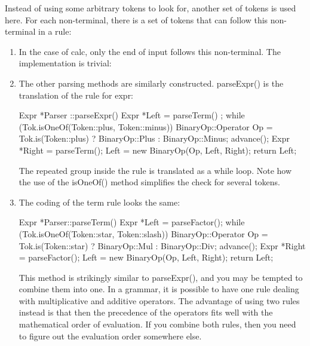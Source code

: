 
Instead of using some arbitrary tokens to look for, another set of tokens is used here. For each non-terminal, there is a set of tokens that can follow this non-terminal in a rule:

\begin{enumerate}
\item
In the case of calc, only the end of input follows this non-terminal. The implementation is trivial:

\begin{cpp}
_error:
    while (!Tok.is(Token::eoi))
        advance();
    return nullptr;
}
\end{cpp}

\item
The other parsing methods are similarly constructed. parseExpr() is the translation of the rule for expr:

\begin{cpp}
Expr *Parser ::parseExpr() {
    Expr *Left = parseTerm() ;
    while (Tok.isOneOf(Token::plus, Token::minus)) {
        BinaryOp::Operator Op =
            Tok.is(Token::plus) ? BinaryOp::Plus :
                                  BinaryOp::Minus;
        advance();
        Expr *Right = parseTerm();
        Left = new BinaryOp(Op, Left, Right);
    }
    return Left;
}
\end{cpp}

The repeated group inside the rule is translated as a while loop. Note how the use of the isOneOf() method simplifies the check for several tokens.

\item
The coding of the term rule looks the same:

\begin{cpp}
Expr *Parser::parseTerm() {
    Expr *Left = parseFactor();
    while (Tok.isOneOf(Token::star, Token::slash)) {
        BinaryOp::Operator Op =
            Tok.is(Token::star) ? BinaryOp::Mul :
                                  BinaryOp::Div;
        advance();
        Expr *Right = parseFactor();
        Left = new BinaryOp(Op, Left, Right);
    }
    return Left;
}
\end{cpp}

This method is strikingly similar to parseExpr(), and you may be tempted to combine them into one. In a grammar, it is possible to have one rule dealing with multiplicative and additive operators. The advantage of using two rules instead is that then the precedence of the operators fits well with the mathematical order of evaluation. If you combine both rules, then you need to figure out the evaluation order somewhere else.


\end{enumerate}
